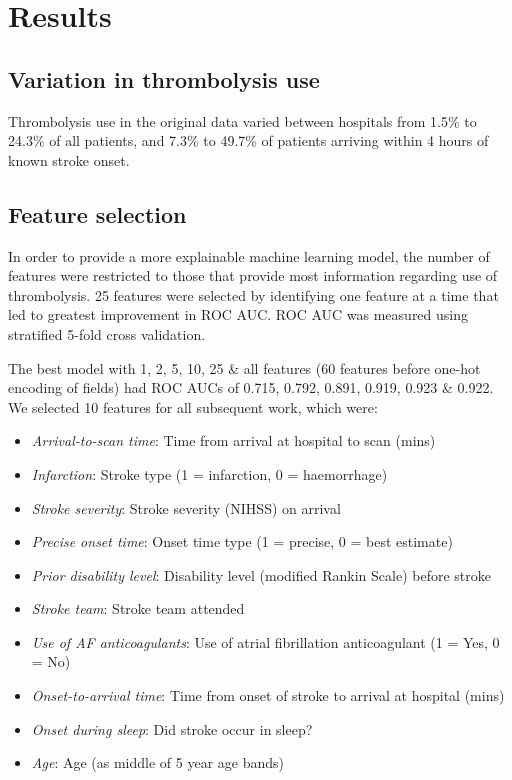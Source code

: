 \section{Results}

\subsection{Variation in thrombolysis use}

Thrombolysis use in the original data varied between hospitals from 1.5\% to 24.3\% of all patients, and 7.3\% to 49.7\% of patients arriving within 4 hours of known stroke onset.


\subsection{Feature selection}

In order to provide a more explainable machine learning model, the number of features were restricted to those that provide most information regarding use of thrombolysis. 25 features were selected by identifying one feature at a time that led to greatest improvement in ROC AUC. ROC AUC was measured using stratified 5-fold cross validation.

The best model with 1, 2, 5, 10, 25 \& all features (60 features before one-hot encoding of fields) had ROC AUCs of 0.715, 0.792, 0.891, 0.919, 0.923 \& 0.922. We selected 10 features for all subsequent work, which were:

\begin{itemize}
    \item \emph{Arrival-to-scan time}: Time from arrival at hospital to scan (mins)
    \item \emph{Infarction}: Stroke type (1 = infarction, 0 = haemorrhage)
    \item \emph{Stroke severity}: Stroke severity (NIHSS) on arrival
    \item \emph{Precise onset time}: Onset time type (1 = precise, 0 = best estimate)
    \item \emph{Prior disability level}: Disability level (modified Rankin Scale) before stroke
    \item \emph{Stroke team}: Stroke team attended
    \item \emph{Use of AF anticoagulants}: Use of atrial fibrillation anticoagulant (1 = Yes, 0 = No)
    \item \emph{Onset-to-arrival time}: Time from onset of stroke to arrival at hospital (mins)
    \item \emph{Onset during sleep}: Did stroke occur in sleep?
    \item \emph{Age}: Age (as middle of 5 year age bands)
\end{itemize}

